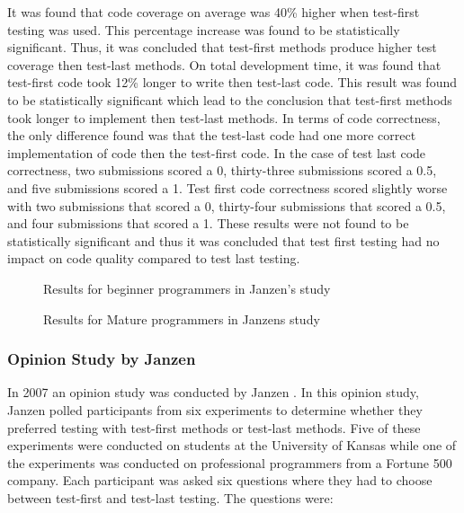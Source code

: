\documentclass{sig-alternate}
\begin{document}
It was found that code coverage on average was 40\% higher when test-first testing was used.  This percentage increase was found to be statistically significant. Thus, it was concluded that test-first methods produce higher test coverage then test-last methods. On total development time, it was found that test-first code took 12\% longer to write then test-last code.  This result was found to be statistically significant which lead to the conclusion that test-first methods took longer to implement then test-last methods. In terms of code correctness, the only difference found was that the test-last code had one more correct implementation of code then the test-first code.  In the case of test last code correctness, two submissions scored a 0, thirty-three submissions scored a 0.5, and five submissions scored a 1.  Test first code correctness scored slightly worse with two submissions that scored a 0, thirty-four submissions that scored a 0.5, and four submissions that scored a 1.  These results were not found to be statistically significant and thus it was concluded that test first testing had no impact on code quality compared to test last testing.

\begin{figure}
\centering
{}
\caption{Results for beginner programmers in Janzen's study}
\end{figure}

\begin{figure}
\centering
{}
\caption{Results for Mature programmers in Janzens study}
\end{figure}

\subsubsection{Opinion Study by Janzen}

In 2007 an opinion study was conducted by Janzen \cite{Janzen:2007}.  In this opinion study, Janzen polled participants from six experiments to determine whether they preferred testing with test-first methods or test-last methods.  Five of these experiments were conducted on students at the University of Kansas while one of the experiments was conducted on professional programmers from a Fortune 500 company.   Each participant was asked six questions where they had to choose between test-first and test-last testing.  The questions were:
\end{document}
